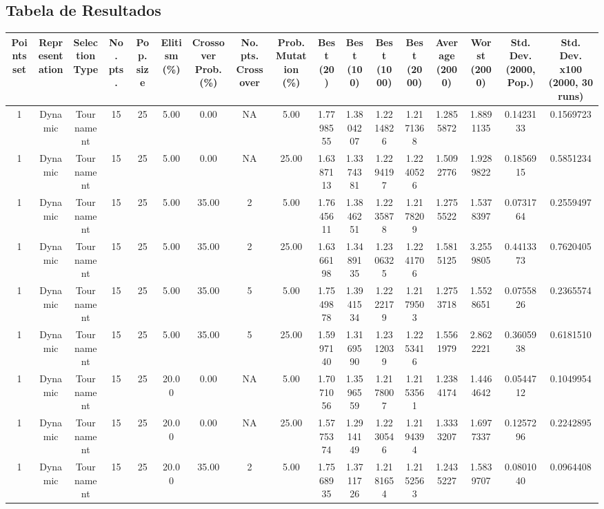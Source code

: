 \documentclass[a4paper]{article}
\begin{document}
\subsection{Tabela de Resultados}
\begin{center}
	\begin{tabular}{ | c | c | c | c | c | c | c | c | c | c | c | c | c | c | c | c | c | }
		\hline
		\textbf{Points set}	&	\textbf{Representation}	&	\textbf{Selection Type}	&	\textbf{No. pts.}	&	\textbf{Pop. size}	&	\textbf{Elitism  (\%)}	&	\textbf{Crossover Prob. (\%)}	&	\textbf{No. pts. Crossover}	&	\textbf{Prob. Mutation (\%)}	&	\textbf{Best (20)}	&	\textbf{Best (100)}	&	\textbf{Best (1000)}	&	\textbf{Best (2000)}	&	\textbf{Average (2000)}	&	\textbf{Worst (2000)}	&	\textbf{Std. Dev. (2000, Pop.)}	&	\textbf{Std. Dev. x100 (2000, 30 runs)} \\
		\hline
		\hline
		1	&	Dynamic	&	Tournament	&	15	&	25	&	5.00	&	0.00	&	NA	&	5.00	&	1.7798555	&	1.3804207	&	1.2214826	&	1.2171368	&	1.2855872	&	1.8891135	&	0.1423133	&	0.1569723 \\
		\hline
		1	&	Dynamic	&	Tournament	&	15	&	25	&	5.00	&	0.00	&	NA	&	25.00	&	1.6387113	&	1.3374381	&	1.2294197	&	1.2240526	&	1.5092776	&	1.9289822	&	0.1856915	&	0.5851234 \\
		\hline
		1	&	Dynamic	&	Tournament	&	15	&	25	&	5.00	&	35.00	&	2	&	5.00	&	1.7645611	&	1.3846251	&	1.2235878	&	1.2178209	&	1.2755522	&	1.5378397	&	0.0731764	&	0.2559497 \\
		\hline
		1	&	Dynamic	&	Tournament	&	15	&	25	&	5.00	&	35.00	&	2	&	25.00	&	1.6366198	&	1.3489135	&	1.2306325	&	1.2241706	&	1.5815125	&	3.2559805	&	0.4413373	&	0.7620405 \\
		\hline
		1	&	Dynamic	&	Tournament	&	15	&	25	&	5.00	&	35.00	&	5	&	5.00	&	1.7549878	&	1.3941534	&	1.2222179	&	1.2179503	&	1.2753718	&	1.5528651	&	0.0755826	&	0.2365574 \\
		\hline
		1	&	Dynamic	&	Tournament	&	15	&	25	&	5.00	&	35.00	&	5	&	25.00	&	1.5997140	&	1.3169590	&	1.2312039	&	1.2253416	&	1.5561979	&	2.8622221	&	0.3605938	&	0.6181510 \\
		\hline
		1	&	Dynamic	&	Tournament	&	15	&	25	&	20.00	&	0.00	&	NA	&	5.00	&	1.7071056	&	1.3596559	&	1.2178007	&	1.2153561	&	1.2384174	&	1.4464642	&	0.0544712	&	0.1049954 \\
		\hline
		1	&	Dynamic	&	Tournament	&	15	&	25	&	20.00	&	0.00	&	NA	&	25.00	&	1.5775374	&	1.2914149	&	1.2230546	&	1.2194394	&	1.3333207	&	1.6977337	&	0.1257296	&	0.2242895 \\
		\hline
		1	&	Dynamic	&	Tournament	&	15	&	25	&	20.00	&	35.00	&	2	&	5.00	&	1.7568935	&	1.3711726	&	1.2181654	&	1.2152563	&	1.2435227	&	1.5839707	&	0.0801040	&	0.0964408 \\

\end{tabular}
\end{center}
\end{document}
